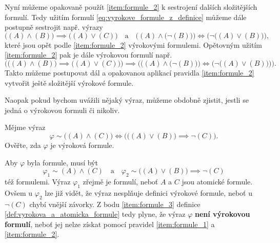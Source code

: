 Nyní můžeme opakovaně použít \ref{item:formule_2} k sestrojení dalších složitějších formulí. Tedy užitím formulí \eqref{eq:vyrokove_formule_z_definice} můžeme dále postupně sestrojit např. výrazy
\begin{equation*}
    \big((A) \land (B)\big) \implies \big((A) \lor (C)\big)\quad\text{a}\quad\Big((A) \land \big(\neg(B)\big)\Big) \iff \Big(\neg\big((A) \lor (B)\big)\Big),
\end{equation*}
které jsou opět podle \ref{item:formule_2} výrokovými formulemi. Opětovným užitím \ref{item:formule_2} pak je dále výrokovou formulí např.
\begin{equation*}
    \Big(\big((A) \land (B)\big) \implies \big((A) \lor (C)\big)\Big) \implies \bigg(\Big((A) \land \big(\neg(B)\big)\Big) \iff \Big(\neg\big((A) \lor (B)\big)\Big)\bigg).
\end{equation*}
Takto můžeme postupovat dál a opakovanou aplikací pravidla \ref{item:formule_2} vytvořit ještě složitější výrokové formule.\par
Naopak pokud bychom uvážili nějaký výraz, můžeme obdobně zjistit, jestli se jedná o výrokovou formuli či nikoliv.
\begin{example}\label{ex:overeni_formule}
    Mějme výraz
    \begin{equation*}
        \varphi\sim\big((A) \land (C)\big) \iff \Big(\big((A) \lor (B)\big) \implies \neg(C)\Big).
    \end{equation*}
    Ověřte, zda $\varphi$ je výroková formule.\par
    \begin{solution}
        Aby $\varphi$ byla formule, musí být
        \begin{equation*}
            \varphi_1\sim(A) \land (C)\quad\text{a}\quad\varphi_2\sim\big((A) \lor (B)\big) \implies \neg(C)
        \end{equation*}
        též formulemi. Výraz $\varphi_1$ zřejmě je formulí, neboť $A$ a $C$ jsou atomické formule. Ovšem u $\varphi_2$ lze již vidět, že výraz nesplňuje definici výrokové formule, neboť u $\neg(C)$ chybí vnější závorky. Z bodu \ref{item:formule_3} definice \ref{def:vyrokova_a_atomicka_formule} tedy plyne, že výraz $\varphi$ \textbf{není výrokovou formulí}, neboť jej nelze získat pomocí pravidel \ref{item:formule_1} a \ref{item:formule_2}.
    \end{solution}
\end{example}

